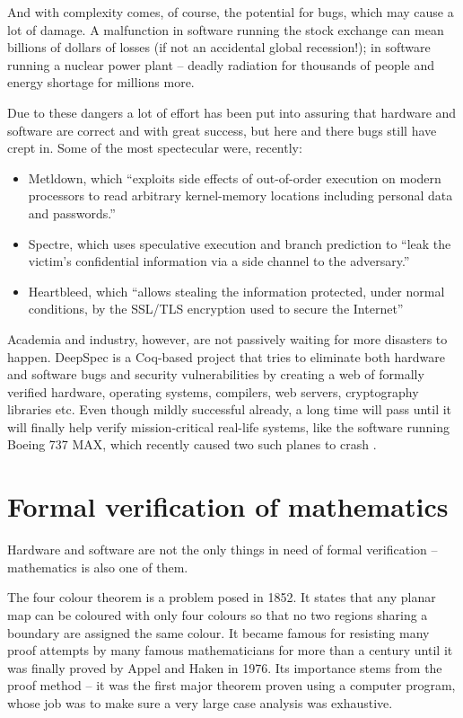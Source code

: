 \documentclass[declaration,inz,english,shortabstract]{iithesis}
\begin{document}
And with complexity comes, of course, the potential for bugs, which may cause a lot of damage. A malfunction in software running the stock exchange can mean billions of dollars of losses (if not an accidental global recession!); in software running a nuclear power plant -- deadly radiation for thousands of people and energy shortage for millions more.

Due to these dangers a lot of effort has been put into assuring that hardware and software are correct and with great success, but here and there bugs still have crept in. Some of the most spectecular were, recently:

\begin{itemize}
    \item Metldown, which ``exploits side effects of out-of-order execution on modern processors to read arbitrary kernel-memory locations including  personal  data  and  passwords.'' \cite{Meltdown}
    \item Spectre, which uses speculative execution and branch prediction to ``leak the victim's confidential information via a side  channel to  the  adversary.'' \cite{Spectre}
    \item Heartbleed, which ``allows stealing the information protected, under normal conditions, by the SSL/TLS encryption used to secure the Internet'' \cite{Heartbleed}
\end{itemize}

Academia and industry, however, are not passively waiting for more disasters to happen. DeepSpec \cite{DeepSpec} is a Coq-based project that tries to eliminate both hardware and software bugs and security vulnerabilities by creating a web of formally verified hardware, operating systems, compilers, web servers, cryptography libraries etc. Even though mildly successful already, a long time will pass until it will finally help verify mission-critical real-life systems, like the software running Boeing 737 MAX, which recently caused two such planes to crash \cite{Boeing}.

\section{Formal verification of mathematics}

Hardware and software are not the only things in need of formal verification -- mathematics is also one of them.

The four colour theorem is a problem posed in 1852. It states that any planar map can be coloured with only four colours so that no two regions sharing a boundary are assigned the same colour. It became famous for resisting many proof attempts by many famous mathematicians for more than a century until it was finally proved by Appel and Haken in 1976. Its importance stems from the proof method -- it was the first major theorem proven using a computer program, whose job was to make sure a very large case analysis was exhaustive.
\end{document}
